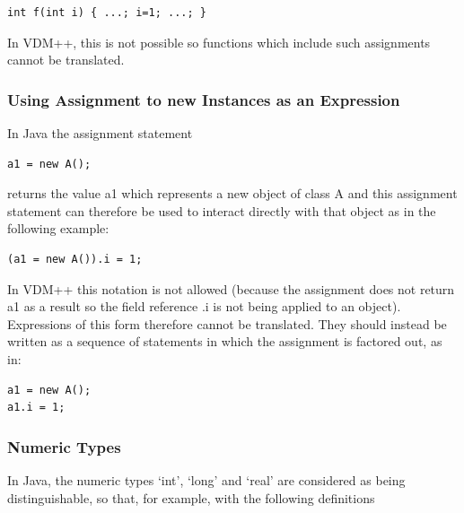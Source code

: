 \documentclass[\pformat,12pt]{article}
\begin{document}
\begin{small}
\begin{verbatim}
int f(int i) { ...; i=1; ...; }
\end{verbatim}
\end{small}

In VDM++, this is not possible so functions which include such
assignments cannot be translated. 

\subsubsection{Using Assignment to new Instances as an Expression}

In Java the assignment statement

\begin{small}
\begin{verbatim}
a1 = new A();
\end{verbatim}
\end{small}

returns the value a1 which represents a new object of class A and this
assignment statement can therefore be used to interact directly with
that object as in the following example:

\begin{small}
\begin{verbatim}
(a1 = new A()).i = 1;
\end{verbatim}
\end{small}


In VDM++ this notation is not allowed (because the assignment does not
return a1 as a result so the field reference .i is not being applied
to an object). Expressions of this form therefore cannot be
translated. They should instead be written as a sequence of statements
in which the assignment is factored out, as in:

\begin{small}
\begin{verbatim}
a1 = new A();
a1.i = 1;
\end{verbatim}
\end{small}


\subsubsection{Numeric Types}

In Java, the numeric types `int', `long' and `real' are considered as
being distinguishable, so that, for example, with the following
definitions 
\end{document}
